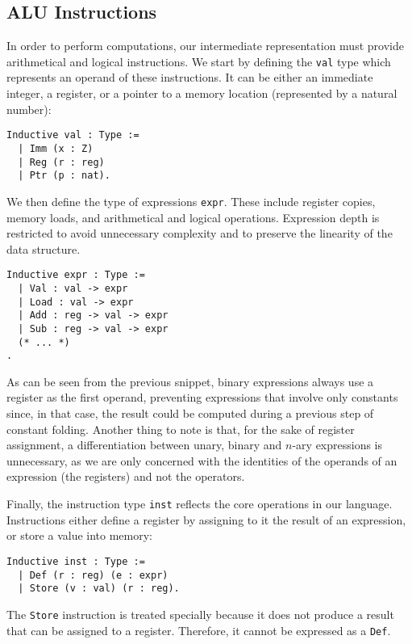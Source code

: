 \subsection{ALU Instructions}

In order to perform computations, our intermediate representation must provide arithmetical and logical instructions.
We start by defining the \texttt{val} type which represents an operand of these instructions. It can be either an immediate integer, a register, or a pointer to a memory location (represented by a natural number):

\begin{lstlisting}[style=Rocq]
Inductive val : Type :=
  | Imm (x : Z)
  | Reg (r : reg)
  | Ptr (p : nat).
\end{lstlisting}

We then define the type of expressions \texttt{expr}. These include register copies, memory loads, and arithmetical and logical operations. Expression depth is restricted to avoid unnecessary complexity and to preserve the linearity of the data structure.

\begin{lstlisting}[style=Rocq]
Inductive expr : Type :=
  | Val : val -> expr
  | Load : val -> expr
  | Add : reg -> val -> expr
  | Sub : reg -> val -> expr
  (* ... *)
.
\end{lstlisting}

As can be seen from the previous snippet, binary expressions always use a register as the first operand, preventing expressions that involve only constants since, in that case, the result could be computed during a previous step of constant folding. Another thing to note is that, for the sake of register assignment, a differentiation between unary, binary and $n$-ary expressions is unnecessary, as we are only concerned with the identities of the operands of an expression (the registers) and not the operators.

Finally, the instruction type \texttt{inst} reflects the core operations in our language. Instructions either define a register by assigning to it the result of an expression, or store a value into memory:

\begin{lstlisting}[style=Rocq]
Inductive inst : Type :=
  | Def (r : reg) (e : expr)
  | Store (v : val) (r : reg).
\end{lstlisting}

The \texttt{Store} instruction is treated specially because it does not produce a result that can be assigned to a register. Therefore, it cannot be expressed as a \texttt{Def}.

